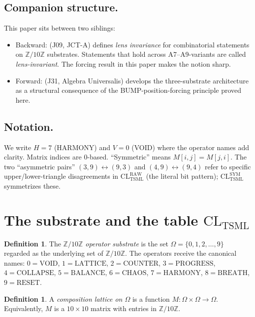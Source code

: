\documentclass[11pt,reqno]{amsart}
\theoremstyle{plain}
\theoremstyle{definition}
\newtheorem{definition}[theorem]{Definition}
\theoremstyle{remark}
\newcommand{\Z}{\mathbb{Z}}
\newcommand{\TSML}{\mathrm{TSML}}
\begin{document}
\subsection{Companion structure.}
This paper sits between two siblings:
\begin{itemize}
\item Backward: \cite{SandersLensInvariance} (J09, JCT-A) defines
\emph{lens invariance} for combinatorial statements on $\Z/10\Z$
substrates. Statements that hold across A7--A9-variants are called
\emph{lens-invariant}. The forcing result in this paper makes the
notion sharp.
\item Forward: \cite{SandersGishThreeSubstrate} (J31, Algebra
Universalis) develops the three-substrate architecture as a structural
consequence of the BUMP-position-forcing principle proved here.
\end{itemize}

\subsection{Notation.}
We write $H = 7$ (HARMONY) and $V = 0$ (VOID) where the operator names
add clarity. Matrix indices are $0$-based. ``Symmetric'' means
$M[i,j] = M[j,i]$. The two ``asymmetric pairs'' $(3,9){\leftrightarrow}(9,3)$
and $(4,9){\leftrightarrow}(9,4)$ refer to specific upper/lower-triangle
disagreements in $\mathrm{CL}_\TSML^{\text{RAW}}$ (the literal bit
pattern); $\mathrm{CL}_\TSML^{\text{SYM}}$ symmetrizes these.

\section{The substrate and the table $\mathrm{CL}_\TSML$}
\label{sec:substrate}

\begin{definition}\label{def:substrate}
The \emph{$\Z/10\Z$ operator substrate} is the set
$\Omega = \{0, 1, 2, \ldots, 9\}$ regarded as the underlying set of
$\Z/10\Z$. The operators receive the canonical names:
$0 = \text{VOID}$, $1 = \text{LATTICE}$, $2 = \text{COUNTER}$,
$3 = \text{PROGRESS}$, $4 = \text{COLLAPSE}$, $5 = \text{BALANCE}$,
$6 = \text{CHAOS}$, $7 = \text{HARMONY}$, $8 = \text{BREATH}$,
$9 = \text{RESET}$.
\end{definition}

\begin{definition}\label{def:CL}
A \emph{composition lattice on $\Omega$} is a function
$M : \Omega \times \Omega \to \Omega$. Equivalently, $M$ is a
$10 \times 10$ matrix with entries in $\Z/10\Z$.
\end{definition}
\end{document}
